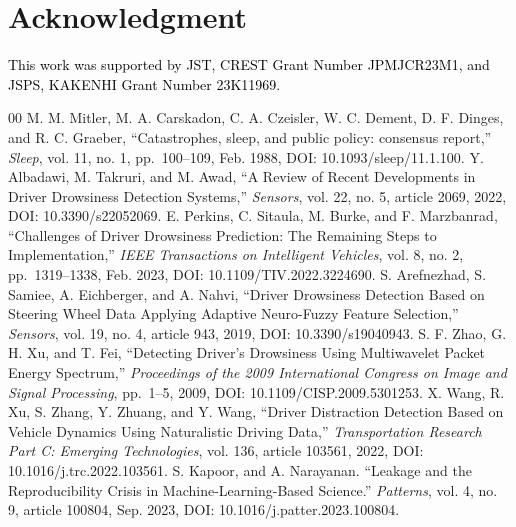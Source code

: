 \documentclass[letterpaper, 10 pt, conference]{ieeeconf}  %
\newcommand{\Ishii}[1]{\textcolor{black}{#1}}
\begin{document}
\section*{Acknowledgment}

\Ishii{This work was supported by JST, CREST Grant Number JPMJCR23M1, and JSPS, KAKENHI Grant Number 23K11969.}


\begin{thebibliography}{00}
 M. M. Mitler, M. A. Carskadon, C. A. Czeisler, W. C. Dement, D. F. Dinges, and R. C. Graeber, 
    ``Catastrophes, sleep, and public policy: consensus report,'' 
    \textit{Sleep}, vol. 11, no. 1, pp.~100--109, Feb. 1988, DOI: 10.1093/sleep/11.1.100.
 Y. Albadawi, M. Takruri, and M. Awad,  
    ``A Review of Recent Developments in Driver Drowsiness Detection Systems,''  
    \textit{Sensors}, vol. 22, no. 5, article 2069, 2022, DOI: 10.3390/s22052069.
 E. Perkins, C. Sitaula, M. Burke, and F. Marzbanrad,  
    ``Challenges of Driver Drowsiness Prediction: The Remaining Steps to Implementation,''  
    \textit{IEEE Transactions on Intelligent Vehicles}, vol. 8, no. 2, pp.~1319--1338, Feb. 2023, DOI: 10.1109/TIV.2022.3224690.
 S. Arefnezhad, S. Samiee, A. Eichberger, and A. Nahvi,
    ``Driver Drowsiness Detection Based on Steering Wheel Data Applying Adaptive Neuro-Fuzzy Feature Selection,''
    \textit{Sensors}, vol. 19, no. 4, article 943, 2019, DOI: 10.3390/s19040943.
 S. F. Zhao, G. H. Xu, and T. Fei,
    ``Detecting Driver's Drowsiness Using Multiwavelet Packet Energy Spectrum,''
    \textit{Proceedings of the 2009 International Congress on Image and Signal Processing}, pp.~1--5, 2009, DOI: 10.1109/CISP.2009.5301253.
 X. Wang, R. Xu, S. Zhang, Y. Zhuang, and Y. Wang,
    ``Driver Distraction Detection Based on Vehicle Dynamics Using Naturalistic Driving Data,''
    \textit{Transportation Research Part C: Emerging Technologies}, vol. 136, article 103561, 2022, DOI: 10.1016/j.trc.2022.103561.
 S. Kapoor, and A. Narayanan. 
    ``Leakage and the Reproducibility Crisis in Machine-Learning-Based Science.''
    \textit{Patterns}, vol. 4, no. 9, article 100804, Sep. 2023, DOI: 10.1016/j.patter.2023.100804.

\end{thebibliography}
\end{document}
